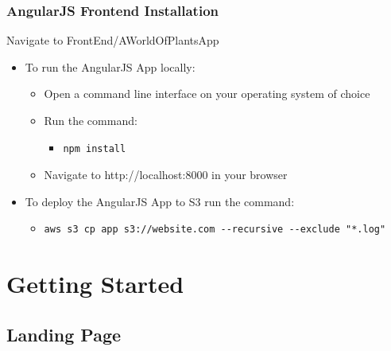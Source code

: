 \documentclass{article}
\begin{document}
		\subsubsection{AngularJS Frontend Installation}
			Navigate to FrontEnd/AWorldOfPlantsApp
			\begin{itemize}
				\item To run the AngularJS App locally:
					\begin{itemize}
						\item Open a command line interface on your operating system of choice
						\item Run the command:
							\begin{itemize}
								\item 
\begin{lstlisting}
npm install
\end{lstlisting}
							\end{itemize}
						\item Navigate to http://localhost:8000 in your browser
					\end{itemize}
				\item To deploy the AngularJS App to S3 run the command:
					\begin{itemize}
						\item
\begin{lstlisting}
aws s3 cp app s3://website.com --recursive --exclude "*.log"
\end{lstlisting}
					\end{itemize}
			\end{itemize}		

\section{Getting Started}
	\subsection{Landing Page}
\end{document}

